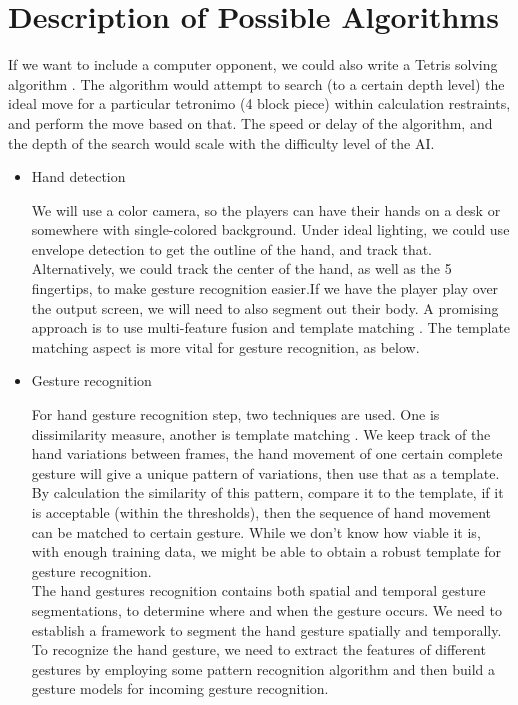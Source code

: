 \documentclass{article}
\begin{document}
	\section{Description of Possible Algorithms}
	If we want to include a computer opponent, we could also write a Tetris solving algorithm \cite{ai}. The algorithm would attempt to search (to a certain depth level) the ideal move for a particular tetronimo (4 block piece) within calculation restraints, and perform the move based on that. The speed or delay of the algorithm, and the depth of the search would scale with the difficulty level of the AI.
	
	\begin{itemize}
		\item{Hand detection}
		
		We will use a color camera, so the players can have their hands on a desk or somewhere with single-colored background. Under ideal lighting, we could use envelope detection to get the outline of the hand, and track that. Alternatively, we could track the center of the hand, as well as the 5 fingertips, to make gesture recognition easier.If we have the player play over the output screen, we will need to also segment out their body. A promising approach is to use multi-feature fusion and template matching \cite{multifeaturefusionarticle}. The template matching aspect is more vital for gesture recognition, as below.\\
		\item{Gesture recognition}
		
		For hand gesture recognition step, two techniques are used. One is dissimilarity measure, another is template matching \cite{ren2011robust}. We keep track of the hand variations between frames, the hand movement of one certain complete gesture will give a unique pattern of variations, then use that as a template. By calculation the similarity of this pattern, compare it to the template, if it is acceptable (within the thresholds), then the sequence of hand movement  can be matched to certain gesture. While we don’t know how viable it is, with enough training data, we might be able to obtain a robust template for gesture recognition.\\
		
		The hand gestures recognition contains both spatial and temporal gesture segmentations, to determine where and when the gesture occurs. We need to establish a framework to segment the hand gesture spatially and temporally. To recognize the hand gesture, we need to extract the features of different gestures by employing some pattern recognition algorithm and then build a gesture models for incoming gesture recognition.\\
	\end{itemize}
	
\end{document}
